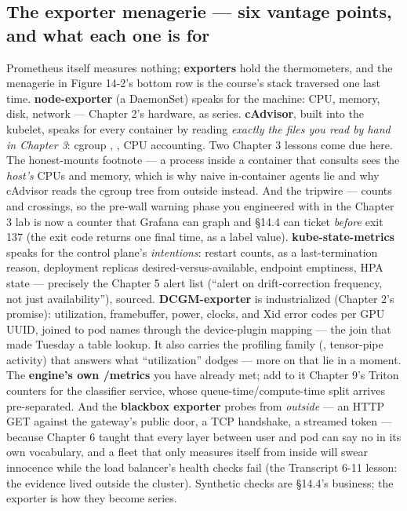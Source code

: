 \subsection*{The exporter menagerie — six vantage points, and what each one is for}

Prometheus itself measures nothing; \textbf{exporters} hold the thermometers, and the menagerie in Figure 14-2’s bottom row is the course’s stack traversed one last time. \textbf{node-exporter} (a DaemonSet) speaks for the machine: CPU, memory, disk, network — Chapter 2’s hardware, as series. \textbf{cAdvisor}, built into the kubelet, speaks for every container by reading \textit{exactly the files you read by hand in Chapter 3}: cgroup , , CPU accounting. Two Chapter 3 lessons come due here. The honest-mounts footnote — a process inside a container that consults  sees the \textit{host’s} CPUs and memory, which is why naive in-container agents lie and why cAdvisor reads the cgroup tree from outside instead. And the tripwire —  counts  and  crossings, so the pre-wall warning phase you engineered with  in the Chapter 3 lab is now a counter that Grafana can graph and §14.4 can ticket \textit{before} exit 137 (the exit code returns one final time, as a label value). \textbf{kube-state-metrics} speaks for the control plane’s \textit{intentions}: restart counts,  as a last-termination reason, deployment replicas desired-versus-available, endpoint emptiness, HPA state — precisely the Chapter 5 alert list (“alert on drift-correction frequency, not just availability”), sourced. \textbf{DCGM-exporter} is  industrialized (Chapter 2’s promise): utilization, framebuffer, power, clocks, and Xid error codes per GPU UUID, joined to pod names through the device-plugin mapping — the join that made Tuesday a table lookup. It also carries the profiling family (, tensor-pipe activity) that answers what “utilization” dodges — more on that lie in a moment. The \textbf{engine’s own /metrics} you have already met; add to it Chapter 9’s Triton counters for the classifier service, whose queue-time/compute-time split arrives pre-separated. And the \textbf{blackbox exporter} probes from \textit{outside} — an HTTP GET against the gateway’s public door, a TCP handshake, a streamed token — because Chapter 6 taught that every layer between user and pod can say no in its own vocabulary, and a fleet that only measures itself from inside will swear innocence while the load balancer’s health checks fail (the Transcript 6-11 lesson: the evidence lived outside the cluster). Synthetic checks are §14.4’s business; the exporter is how they become series.

